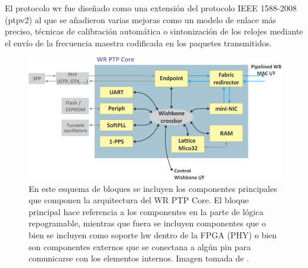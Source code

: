 El protocolo \gls{wr} fue diseñado como una extensión del protocolo IEEE 
1588-2008 (\gls{ptp}v2) al que se añadieron varias mejoras como un modelo de 
enlace más preciso, técnicas de calibración automática o sintonización de los 
relojes mediante el envío de la frecuencia maestra codificada en los paquetes 
transmitidos.

\begin{figure}
	\centering
	\includegraphics[width=0.7\linewidth]{imagenes/wrpc_inside}
	\caption[Esquema de bloques del WR PTP Core]{En este esquema de bloques se 
	incluyen los componentes principales que componen la arquitectura del WR 
	PTP Core. El bloque principal hace referencia a los componentes en la parte 
	de lógica repogramable, mientras que fuera se incluyen componentes que o 
	bien se incluyen como soporte hw dentro de la FPGA (PHY) o bien son 
	componentes externos que se conectana a algún pin para comunicarse con los 
	elementos internos. Imagen tomada de \cite{Daniluk2012}.}
	\label{fig:wrpcinside}
\end{figure}





